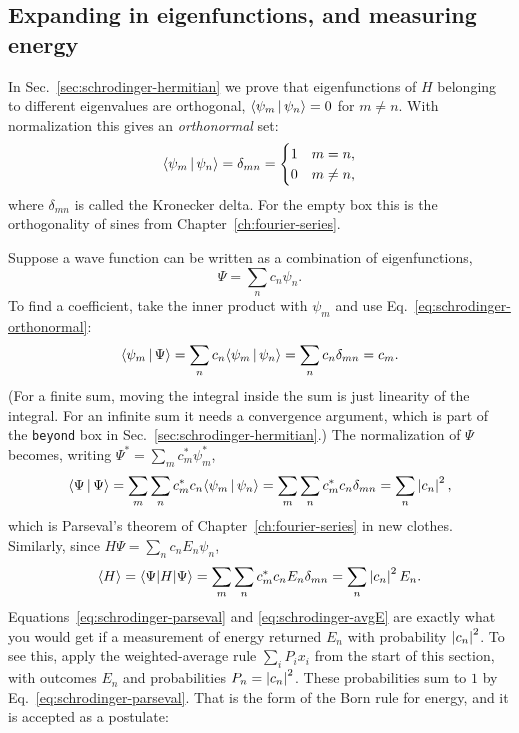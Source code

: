 \subsection{Expanding in eigenfunctions, and measuring energy}

In Sec.~\ref{sec:schrodinger-hermitian} we prove that eigenfunctions of $H$ belonging to different eigenvalues are orthogonal, $\langle \psi_m\,|\,\psi_n\rangle=0$ for $m\neq n$. With normalization this gives an \emph{orthonormal} set:
\begin{equation}
\langle \psi_m\,|\,\psi_n\rangle=\delta_{mn}=\begin{cases}1&m=n,\\0&m\ne n,\end{cases}
\label{eq:schrodinger-orthonormal}
\end{equation}
where $\delta_{mn}$ is called the Kronecker delta. For the empty box this is the orthogonality of sines from Chapter~\ref{ch:fourier-series}.

Suppose a wave function can be written as a combination of eigenfunctions,
\begin{equation}
\Psi=\sum_nc_n\psi_n.
\label{eq:schrodinger-expansion}
\end{equation}
To find a coefficient, take the inner product with $\psi_m$ and use Eq.~\eqref{eq:schrodinger-orthonormal}:
\begin{equation}
\langle \psi_m\,|\,\Psi\rangle=\sum_nc_n\langle \psi_m\,|\,\psi_n\rangle=\sum_nc_n\delta_{mn}=c_m.
\label{eq:schrodinger-cn}
\end{equation}
(For a finite sum, moving the integral inside the sum is just linearity of the integral. For an infinite sum it needs a convergence argument, which is part of the \texttt{beyond} box in Sec.~\ref{sec:schrodinger-hermitian}.) The normalization of $\Psi$ becomes, writing $\Psi^*=\sum_mc_m^*\psi_m^*$,
\begin{equation}
\langle \Psi\,|\,\Psi\rangle=\sum_m\sum_nc_m^*c_n\langle \psi_m\,|\,\psi_n\rangle=\sum_m\sum_nc_m^*c_n\delta_{mn}=\sum_n\left\lvert c_n\right\rvert^2,
\label{eq:schrodinger-parseval}
\end{equation}
which is Parseval's theorem of Chapter~\ref{ch:fourier-series} in new clothes. Similarly, since $H\Psi=\sum_nc_nE_n\psi_n$,
\begin{equation}
\langle H\rangle=\langle \Psi| H|\Psi\rangle=\sum_m\sum_nc_m^*c_nE_n\delta_{mn}=\sum_n\left\lvert c_n\right\rvert^2E_n.
\label{eq:schrodinger-avgE}
\end{equation}
Equations~\eqref{eq:schrodinger-parseval} and \eqref{eq:schrodinger-avgE} are exactly what you would get if a measurement of energy returned $E_n$ with probability $\left\lvert c_n\right\rvert^2$. To see this, apply the weighted-average rule $\sum_iP_ix_i$ from the start of this section, with outcomes $E_n$ and probabilities $P_n=\left\lvert c_n\right\rvert^2$. These probabilities sum to $1$ by Eq.~\eqref{eq:schrodinger-parseval}. That is the form of the Born rule for energy, and it is accepted as a postulate:

